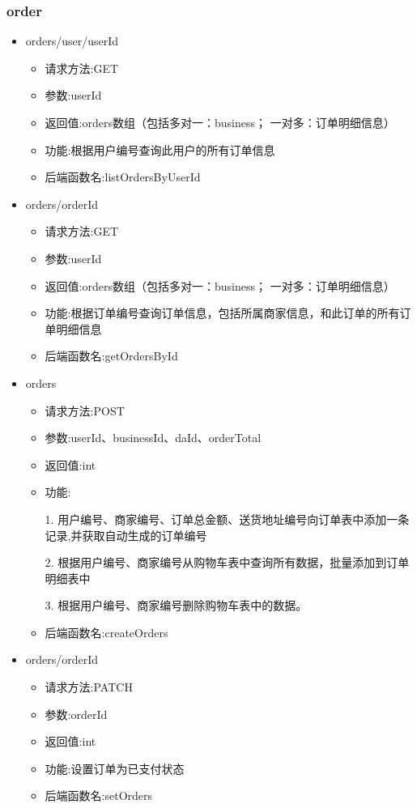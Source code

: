 \subsubsection*{order}
\begin{itemize}
\item orders/user/{userId}
\begin{itemize}
    \item 请求方法:GET
    \item 参数:userId
    \item 返回值:orders数组（包括多对一：business； 一对多：订单明细信息）
    \item 功能:根据用户编号查询此用户的所有订单信息
    \item 后端函数名:listOrdersByUserId
\end{itemize}

\item orders/{orderId}
\begin{itemize}
    \item 请求方法:GET
    \item 参数:userId
    \item 返回值:orders数组（包括多对一：business； 一对多：订单明细信息）
    \item 功能:根据订单编号查询订单信息，包括所属商家信息，和此订单的所有订单明细信息
    \item 后端函数名:getOrdersById
\end{itemize}

\item orders
\begin{itemize}
    \item 请求方法:POST
    \item 参数:userId、businessId、daId、orderTotal
    \item 返回值:int
    \item 功能:\par
        1. 用户编号、商家编号、订单总金额、送货地址编号向订单表中添加一条记录,并获取自动生成的订单编号\par
         2. 根据用户编号、商家编号从购物车表中查询所有数据，批量添加到订单明细表中\par
        3. 根据用户编号、商家编号删除购物车表中的数据。
    \item 后端函数名:createOrders
\end{itemize}

\item orders/{orderId}
\begin{itemize}
    \item 请求方法:PATCH
    \item 参数:orderId
    \item 返回值:int
    \item 功能:设置订单为已支付状态
    \item 后端函数名:setOrders
\end{itemize}


\end{itemize}
